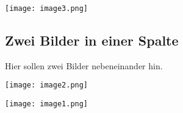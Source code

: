 \par\medskip\noindent\minipage{\linewidth}
\centering
\begin{minipage}[b]{\textwidth}
    \centering
    \texttt{[image: image3.png]}
    \label{fig:someimage}
\end{minipage}
\endminipage\par\medskip

\subsection{Zwei Bilder in einer Spalte}
Hier sollen zwei Bilder nebeneinander hin.
\par\medskip\noindent\minipage{\linewidth}
    \centering
    \begin{minipage}[b]{0.4\textwidth}
        \texttt{[image: image2.png]}
        \label{fig:someotherimage}
    \end{minipage}
    \hfill
    \begin{minipage}[b]{0.4\textwidth}
        \texttt{[image: image1.png]}
        \label{fig:yetanotherimage}
    \end{minipage}
\endminipage\par\medskip




